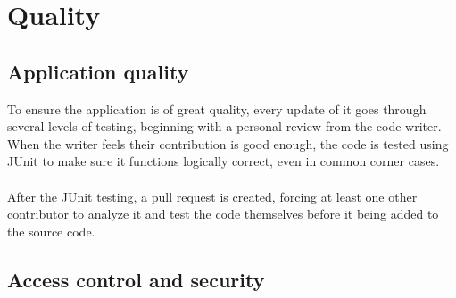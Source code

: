 \section{Quality}
\begin{comment}
	\begin{itemize}
		\item Describe how you test your application and where to find these tests. If
			  applicable, give a link to your continuous integration.
		\item List all known issues.
		\item Run analytical tools on your software and show the results. Use for example:
			  \begin{itemize}
				  \item Dependencies: \href{http://stan4j.com/}{STAN} or similar.
				  \item Quality tool reports, like \href{http://filehippo.com/download_pmd/}{PMD}.
			  \end{itemize}
	\end{itemize}

	NOTE: Each Java, XML, etc. file should have a header comment: Author,
	responsibility, used by ..., uses ..., etc.
\end{comment}
\subsection{Application quality}
To ensure the application is of great quality, every update of it goes through several levels of testing, beginning with a personal review from the code writer. When the writer feels their contribution is good enough, the code is tested using JUnit\cite{JUnit} to make sure it functions logically correct, even in common corner cases.\\
\\
After the JUnit testing, a pull request is created, forcing at least one other contributor to analyze it and test the code themselves before it being added to the source code.
\subsection{Access control and security}